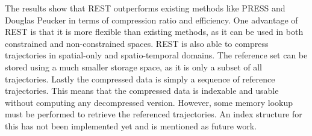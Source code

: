 The results show that REST outperforms existing methods like PRESS and Douglas Peucker in terms of compression ratio and efficiency. One advantage of REST is that it is more flexible than existing methods, as it can be used in both constrained and non-constrained spaces. REST is also able to compress trajectories in spatial-only and spatio-temporal domains. The reference set can be stored using a much smaller storage space, as it is only a subset of all trajectories. Lastly the compressed data is simply a sequence of reference trajectories. This means that the compressed data is indexable and usable without computing any decompressed version. However, some memory lookup must be performed to retrieve the referenced trajectories. An index structure for this has not been implemented yet and is mentioned as future work.

